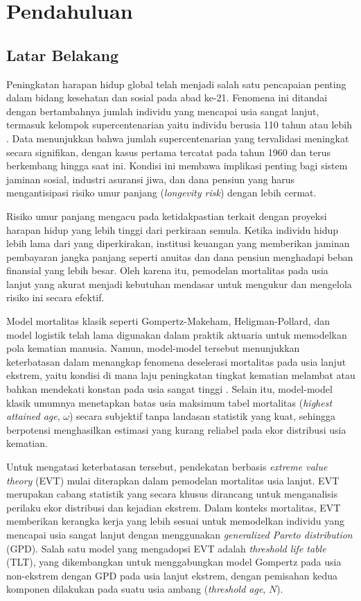 \chapter{Pendahuluan}

\section{Latar Belakang}

Peningkatan harapan hidup global telah menjadi salah satu pencapaian penting dalam bidang kesehatan dan sosial pada abad ke-21. Fenomena ini ditandai dengan bertambahnya jumlah individu yang mencapai usia sangat lanjut, termasuk kelompok supercentenarian yaitu individu berusia 110 tahun atau lebih \citep{Young2021}. Data menunjukkan bahwa jumlah supercentenarian yang tervalidasi meningkat secara signifikan, dengan kasus pertama tercatat pada tahun 1960 dan terus berkembang hingga saat ini. Kondisi ini membawa implikasi penting bagi sistem jaminan sosial, industri asuransi jiwa, dan dana pensiun yang harus mengantisipasi risiko umur panjang (\textit{longevity risk}) dengan lebih cermat.

Risiko umur panjang mengacu pada ketidakpastian terkait dengan proyeksi harapan hidup yang lebih tinggi dari perkiraan semula. Ketika individu hidup lebih lama dari yang diperkirakan, institusi keuangan yang memberikan jaminan pembayaran jangka panjang seperti anuitas dan dana pensiun menghadapi beban finansial yang lebih besar. Oleh karena itu, pemodelan mortalitas pada usia lanjut yang akurat menjadi kebutuhan mendasar untuk mengukur dan mengelola risiko ini secara efektif.

Model mortalitas klasik seperti Gompertz-Makeham, Heligman-Pollard, dan model logistik telah lama digunakan dalam praktik aktuaria untuk memodelkan pola kematian manusia. Namun, model-model tersebut menunjukkan keterbatasan dalam menangkap fenomena deselerasi mortalitas pada usia lanjut ekstrem, yaitu kondisi di mana laju peningkatan tingkat kematian melambat atau bahkan mendekati konstan pada usia sangat tinggi \citep{Thatcher1999}. Selain itu, model-model klasik umumnya menetapkan batas usia maksimum tabel mortalitas (\textit{highest attained age}, $\omega$) secara subjektif tanpa landasan statistik yang kuat, sehingga berpotensi menghasilkan estimasi yang kurang reliabel pada ekor distribusi usia kematian.

Untuk mengatasi keterbatasan tersebut, pendekatan berbasis \textit{extreme value theory} (EVT) mulai diterapkan dalam pemodelan mortalitas usia lanjut. EVT merupakan cabang statistik yang secara khusus dirancang untuk menganalisis perilaku ekor distribusi dan kejadian ekstrem. Dalam konteks mortalitas, EVT memberikan kerangka kerja yang lebih sesuai untuk memodelkan individu yang mencapai usia sangat lanjut dengan menggunakan \textit{generalized Pareto distribution} (GPD). Salah satu model yang mengadopsi EVT adalah \textit{threshold life table} (TLT), yang dikembangkan untuk menggabungkan model Gompertz pada usia non-ekstrem dengan GPD pada usia lanjut ekstrem, dengan pemisahan kedua komponen dilakukan pada suatu usia ambang (\textit{threshold age}, $N$).

